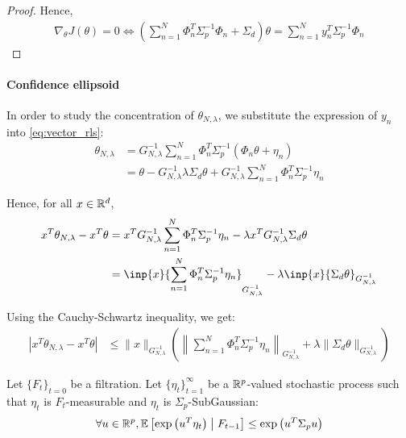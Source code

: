 \documentclass{article}
\begin{document}
{\begin{proof}
Hence,
\begin{align*}
    \nabla_{\theta} J(\theta) = 0 \iff \left(\sum_{n=1}^N\Phi_n^T\Sigma_p^{-1}\Phi_n + \Sigma_d\right)\theta = \sum_{n=1}^N y_n^T\Sigma_p^{-1}\Phi_n
\end{align*}
\end{proof}

\paragraph{Confidence ellipsoid}

In order to study the concentration of $\theta_{N,\lambda}$, we substitute the expression of $y_n$ into \eqref{eq:vector_rls}:
\begin{align*}
    \theta_{N,\lambda} &= G_{N, \lambda}^{-1} \sum_{n=1}^N \Phi_n^T \Sigma_p^{-1} (\Phi_n\theta +\eta_n)\\
    &= \theta - G_{N, \lambda}^{-1}\lambda\Sigma_d\theta + G_{N, \lambda}^{-1}\sum_{n=1}^N \Phi_n^T \Sigma_p^{-1}\eta_n
\end{align*}

Hence, for all $x\in\mathbb{R}^d$,
\begin{align*}
    x^T\theta_{N,\lambda}  -x^T\theta &= x^T G_{N, \lambda}^{-1}\sum_{n=1}^N \Phi_n^T \Sigma_p^{-1}\eta_n
    - \lambda x^T G_{N, \lambda}^{-1}\Sigma_d\theta\\
    &= \inp{x}{\sum_{n=1}^N \Phi_n^T \Sigma_p^{-1}\eta_n}_{G_{N, \lambda}^{-1}} - \lambda\inp{x}{\Sigma_d\theta}_{G_{N, \lambda}^{-1}}
\end{align*}

Using the Cauchy-Schwartz inequality, we get:
\begin{align*}
    |x^T\theta_{N,\lambda}  -x^T\theta| &\leq \|x\|_{G_{N, \lambda}^{-1}}\left(\left\|\sum_{n=1}^N \Phi_n^T \Sigma_p^{-1}\eta_n\right\|_{G_{N, \lambda}^{-1}} + \lambda\|\Sigma_d\theta\|_{G_{N, \lambda}^{-1}}\right)
\end{align*}


\begin{lemma}
Let $\{F_t\}_{t=0}$ be a filtration.
Let $\{\eta_t\}_{t=1}^\infty$ be a $\mathbb{R}^p$-valued stochastic process such that $\eta_t$ is $F_t$-measurable and $\eta_t$ is $\Sigma_p$-SubGaussian:
\begin{equation*}
    \forall u\in\mathbb{R}^p, \operatorname*{\mathbb{E}} \left[ \exp{\left( u^T \eta_t\right)}\;\middle|\; F_{t-1}\right] \leq \exp{\left( u^T \Sigma_p u\right)}
\end{equation*}


\end{lemma}}
\end{document}
